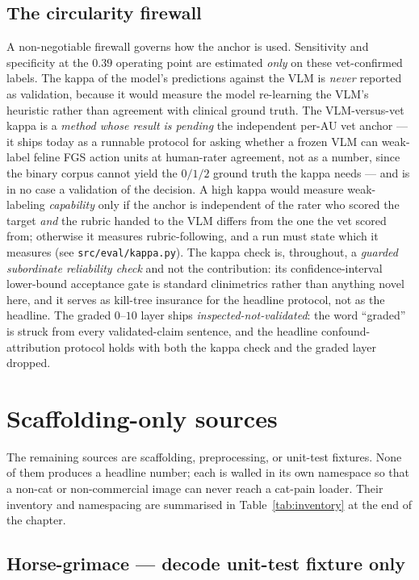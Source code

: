 \subsection{The circularity firewall}
\label{subsec:firewall}

A non-negotiable firewall governs how the anchor is used. Sensitivity and
specificity at the $0.39$ operating point are estimated \emph{only} on these
vet-confirmed labels. The kappa of the model's predictions against the VLM is
\emph{never} reported as validation, because it would measure the model
re-learning the VLM's heuristic rather than agreement with clinical ground
truth. The VLM-versus-vet kappa is a \emph{method whose result is pending} the
independent per-AU vet anchor --- it ships today as a runnable protocol for
asking whether a frozen VLM can weak-label feline FGS action units at human-rater
agreement, not as a number, since the binary corpus cannot yield the $0/1/2$
ground truth the kappa needs --- and is in no case a validation of the decision.
A high kappa would measure weak-labeling \emph{capability} only if the anchor is
independent of the rater who scored the target \emph{and} the rubric handed to
the VLM differs from the one the vet scored from; otherwise it measures
rubric-following, and a run must state which it measures
(see \texttt{src/eval/kappa.py}). The kappa check is, throughout, a
\emph{guarded subordinate reliability check} and not the contribution: its
confidence-interval lower-bound acceptance gate is standard clinimetrics rather
than anything novel here, and it serves as kill-tree insurance for the headline
protocol, not as the headline. The graded $0$--$10$ layer ships
\emph{inspected-not-validated}: the word ``graded'' is struck from every
validated-claim sentence, and the headline confound-attribution protocol holds
with both the kappa check and the graded layer dropped.

\section{Scaffolding-only sources}
\label{sec:scaffolding}

The remaining sources are scaffolding, preprocessing, or unit-test fixtures.
None of them produces a headline number; each is walled in its own namespace so
that a non-cat or non-commercial image can never reach a cat-pain loader. Their
inventory and namespacing are summarised in Table~\ref{tab:inventory} at the end
of the chapter.

\subsection{Horse-grimace --- decode unit-test fixture only}
\label{subsec:horse}

